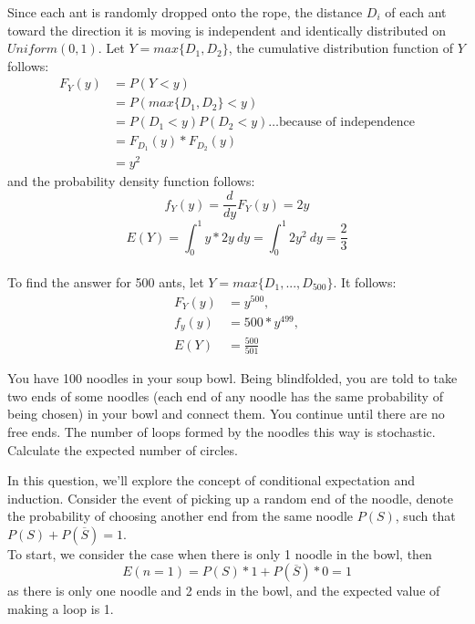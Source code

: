 \documentclass[answers]{exam}
\begin{document}
\begin{questions}
\begin{solution}
Since each ant is randomly dropped onto the rope, the distance $D_i$ of each ant toward the direction it is moving is 
independent and identically distributed on $Uniform(0,1)$. 
Let $Y = max\{D_1, D_2\}$, the cumulative distribution function of $Y$ follows:
\begin{align*}
    F_Y(y) &= P(Y<y)\\
    &= P(max\{D_1, D_2\}<y)\\
    &= P(D_1<y)P(D_2<y) \dots \text{because of independence}\\
    &= F_{D_1}(y)*F_{D_2}(y)\\
    &= y^2
\end{align*}
and the probability density function follows:
$$f_Y(y) = \frac{d}{dy}F_Y(y) = 2y$$
$$E(Y) = \int_{0}^{1} y * 2y\ dy = \int_{0}^{1}2y^2\ dy = \frac{2}{3}$$
\\
To find the answer for 500 ants, let $Y = max\{D_1,..., D_{500}\}$. It follows:
\begin{align*}
    F_Y(y) &= y^{500},\\
    f_y(y) &= 500*y^{499},\\
    E(Y) &= \frac{500}{501}
\end{align*}

\end{solution}

\question
You have 100 noodles in your soup bowl. Being blindfolded, 
you are told to take two ends of some noodles 
(each end of any noodle has the same probability of being chosen) 
in your bowl and connect them. 
You continue until there are no free ends. 
The number of loops formed by the noodles this way is stochastic. 
Calculate the expected number of circles.

\begin{solution}
    In this question, we'll explore the concept of conditional expectation and induction. Consider the event of picking up a random end of the noodle, denote
    the probability of choosing another end from the same noodle $P(S)$, such that $P(S)+P(\overline{S}) = 1$.\\
    To start, we consider the case when there is only 1 noodle in the bowl, 
    then 
    $$E(n=1)=P(S)*1+P(\overline{S})*0 = 1$$
    as there is only one noodle and 2 ends in the bowl, and the expected value of
    making a loop is 1. \\


\end{solution}
\end{questions}
\end{document}
